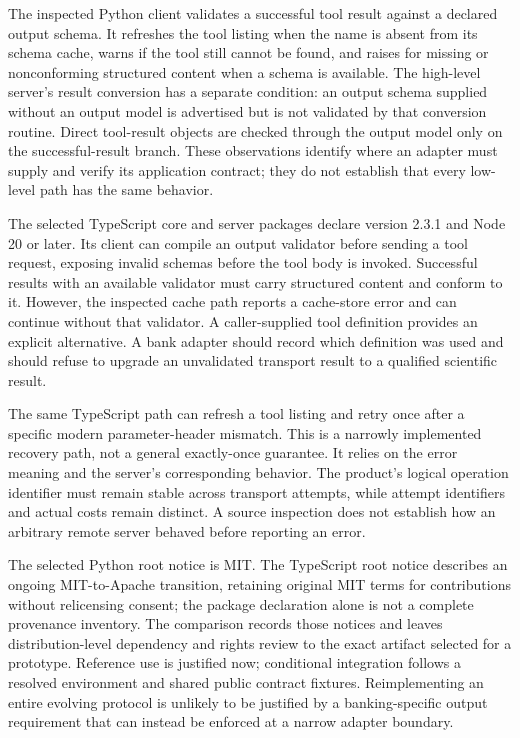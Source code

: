 The inspected Python client validates a successful tool result against a
declared output schema. It refreshes the tool listing when the name is absent
from its schema cache, warns if the tool still cannot be found, and raises
for missing or nonconforming structured content when a schema is available.
The high-level server's result conversion has a separate condition: an output
schema supplied without an output model is advertised but is not validated
by that conversion routine. Direct tool-result objects are checked through
the output model only on the successful-result branch. These observations
identify where an adapter must supply and verify its application contract;
they do not establish that every low-level path has the same behavior.
\citep{exec24_mcp_python}

The selected TypeScript core and server packages declare version 2.3.1 and
Node 20 or later. Its client can compile an output validator before sending a
tool request, exposing invalid schemas before the tool body is invoked.
Successful results with an available validator must carry structured content
and conform to it. However, the inspected cache path reports a cache-store
error and can continue without that validator. A caller-supplied tool
definition provides an explicit alternative. A bank adapter should record
which definition was used and should refuse to upgrade an unvalidated
transport result to a qualified scientific result.\citep{exec24_mcp_typescript}

The same TypeScript path can refresh a tool listing and retry once after a
specific modern parameter-header mismatch. This is a narrowly implemented
recovery path, not a general exactly-once guarantee. It relies on the error
meaning and the server's corresponding behavior. The product's logical
operation identifier must remain stable across transport attempts, while
attempt identifiers and actual costs remain distinct. A source inspection
does not establish how an arbitrary remote server behaved before reporting
an error.\citep{exec24_mcp_typescript,exec24_mcp_contracts}

The selected Python root notice is MIT. The TypeScript root notice describes
an ongoing MIT-to-Apache transition, retaining original MIT terms for
contributions without relicensing consent; the package declaration alone is
not a complete provenance inventory. The comparison records those notices
and leaves distribution-level dependency and rights review to the exact
artifact selected for a prototype. Reference use is justified now;
conditional integration follows a resolved environment and shared public
contract fixtures. Reimplementing an entire evolving protocol is unlikely
to be justified by a banking-specific output requirement that can instead
be enforced at a narrow adapter boundary.\citep{exec24_mcp_python,
exec24_mcp_typescript,exec24_mcp_contracts}

